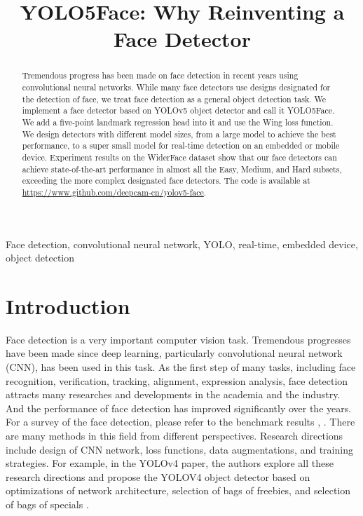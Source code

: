 \documentclass[conference]{IEEEtran}
\begin{document}
\title{YOLO5Face: Why Reinventing a Face Detector}



\author{
}

\maketitle

\begin{abstract}
 Tremendous progress has been made on face detection in recent years using convolutional neural networks. While many face detectors use designs designated for the detection of face, we treat face detection as a general object detection task. We implement a face detector based on YOLOv5 object detector and call it YOLO5Face. We add a five-point landmark regression head into it and use the Wing loss function. We design detectors with different model sizes, from a large model to achieve the best performance, to a super small model for real-time detection on an embedded or mobile device. Experiment results on the WiderFace dataset show that our face detectors can achieve state-of-the-art performance in almost all the Easy, Medium, and Hard subsets, exceeding the more complex designated face detectors. The code is available at \url{https://www.github.com/deepcam-cn/yolov5-face}.  
 \end{abstract}

\begin{IEEEkeywords}
Face detection, convolutional neural network, YOLO, real-time, embedded device, object detection 
\end{IEEEkeywords}

\section{Introduction}

Face detection is a very important computer vision task. Tremendous progresses have been made since deep learning, particularly convolutional neural network (CNN), has been used in this task. As the first step of many tasks, including face recognition, verification, tracking, alignment, expression analysis, face detection attracts many researches and developments in the academia and the industry. And the performance of face detection has improved significantly over the years. For a survey of the face detection, please refer to the benchmark results \cite{WiderFace}, \cite{WiderFaceWeb}.   
There are many methods in this field from different perspectives. Research directions include design of CNN network, loss functions, data augmentations, and training strategies. For example, in the YOLOv4 paper, the authors explore all these research directions and propose the YOLOV4 object detector based on optimizations of network architecture, selection of bags of freebies, and selection of bags of specials \cite{YOLOv4}.  
\end{document}
